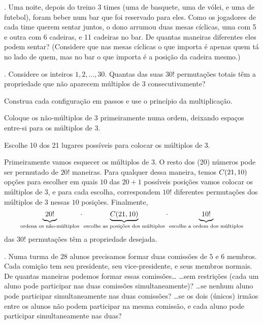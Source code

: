 \endproblem

\problem.
Uma noite, depois do treino 3 times (uma de basquete, uma de vólei, e uma de
futebol), foram beber num bar que foi reservado para eles.
Como os jogadores de cada time querem sentar juntos,
o dono arrumou duas mesas cíclicas, uma com 5 e outra com 6 cadeiras, e 11 cadeiras no bar.
\endgraf
De quantas maneiras diferentes eles podem sentar?
(Considere que nas mesas cíclicas o que importa é apenas quem tá no lado de quem, mas no bar o que importa é a posição da cadeira mesmo.)

\endproblem

\problem.
Considere os inteiros $1,2,\dotsc, 30$.
Quantas das suas $30!$ permutações totais têm a propriedade que
não aparecem múltiplos de $3$ consecutivamente?

\hint
Construa cada configuração em passos e use o princípio da multiplicação.

\hint
Coloque os não-múltiplos de 3 primeiramente numa ordem, deixando espaços entre-si
para os múltiplos de 3.

\hint
Escolhe 10 dos 21 lugares possíveis para colocar os múltiplos de 3.

\solution
Primeiramente vamos esquecer os múltiplos de 3.
O resto dos (20) números pode ser permutado de
$20!$ maneiras.
Para qualquer dessa maneira, temos $C(21,10)$
opções para escolher em quais $10$ das $20+1$ possíveis posições vamos colocar os múltiplos de 3,
e para cada escolha, correspondem $10!$ diferentes permutações dos múltiplos de 3 nessas $10$ posições.
Finalmente,
$$
\underbrace{\phantom(20!\phantom)}_{\text{ordena os não-múltiplos}}\ntimes \underbrace{\comb {21} {10}}_{\text{escolhe as posições dos múltiplos}}\ntimes \underbrace{\phantom(10!\phantom)}_{\text{escolhe a ordem dos múltiplos}}
$$
das $30!$ permutações têm a propriedade desejada.

\endproblem

\problem.
Numa turma de $28$ alunos
precisamos formar duas comissões de $5$ e $6$ membros.
Cada comição tem seu presidente, seu vice-presidente, e seus membros normais.
De quantas maneiras podemos formar essas comissões\dots
\beginol
\li\dots sem restrições (cada um aluno pode participar nas duas comissões simultaneamente)?
\li\dots se nenhum aluno pode participar simultaneamente nas duas comissões?
\li\dots se os dois (únicos) irmãos entre os alunos não podem participar na mesma comissão,
e cada aluno pode participar simultaneamente nas duas?
\endol


